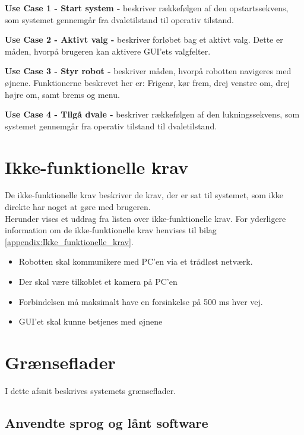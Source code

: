 \textbf{Use Case 1 - Start system -} beskriver rækkefølgen af den opstartssekvens, som systemet gennemgår fra dvaletilstand til operativ tilstand.

\textbf{Use Case 2 - Aktivt valg -} beskriver forløbet bag et aktivt valg. Dette er måden, hvorpå brugeren kan aktivere GUI'ets valgfelter.

\textbf{Use Case 3 - Styr robot -} beskriver måden, hvorpå robotten navigeres med øjnene. Funktionerne beskrevet her er: Frigear, kør frem, drej venstre om, drej  højre om, samt brems og menu. 

\textbf{Use Case 4 - Tilgå dvale -} beskriver rækkefølgen af den lukningssekvens, som systemet gennemgår fra operativ tilstand til dvaletilstand.


\section{Ikke-funktionelle krav}
De ikke-funktionelle krav beskriver de krav, der er sat til systemet, som ikke direkte har noget at gøre med brugeren. \\
Herunder vises et uddrag fra listen over ikke-funktionelle krav. 
For yderligere information om de ikke-funktionelle krav henvises til bilag \ref{appendix:Ikke_funktionelle_krav}.

\begin{itemize}
	\item Robotten skal kommunikere med PC'en via et trådløst netværk.
	\item Der skal være tilkoblet et kamera på PC'en
	\item Forbindelsen må maksimalt have en forsinkelse på 500 ms hver vej.
	\item GUI'et skal kunne betjenes med øjnene
\end{itemize}

\newpage
\section{Grænseflader}
I dette afsnit beskrives systemets grænseflader.

\subsection{Anvendte sprog og lånt software}
